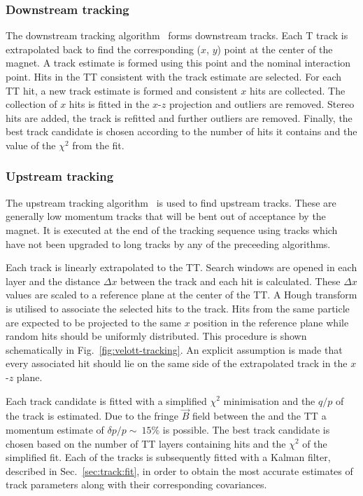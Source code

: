 \subsubsection{Downstream tracking}
\label{sec:track:algos:downstream}

The downstream tracking algorithm~\cite{patdownstream,sascha} forms downstream tracks. Each T track is extrapolated back to find the corresponding ($x$, $y$) point at the center of the magnet. A track estimate is formed using this point and the nominal interaction point. Hits in the TT consistent with the track estimate are selected. For each TT hit, a new track estimate is formed and consistent $x$ hits are collected. The collection of $x$ hits is fitted in the $x$-$z$ projection and outliers are removed. Stereo hits are added, the track is refitted and further outliers are removed. Finally, the best track candidate is chosen according to the number of hits it contains and the value of the $\chi^{2}$ from the fit.


\subsubsection{Upstream tracking}
\label{sec:track:algos:upstream}

The upstream tracking algorithm~\cite{patvelott} is used to find upstream tracks. These are generally low momentum tracks that will be bent out of acceptance by the magnet. It is executed at the end of the tracking sequence using \velo tracks which have not been upgraded to long tracks by any of the preceeding algorithms. 

Each \velo track is linearly extrapolated to the TT. Search windows are opened in each layer and the distance $\Delta x$ between the track and each hit is calculated. These $\Delta x$ values are scaled to a reference plane at the center of the TT. A Hough transform is utilised to associate the selected hits to the \velo track. Hits from the same particle are expected to be projected to the same $x$ position in the reference plane while random hits should be uniformly distributed. This procedure is shown schematically in Fig.~\ref{fig:velott-tracking}. An explicit assumption is made that every associated hit should lie on the same side of the extrapolated \velo track in the $x$-$z$ plane. 

 Each track candidate is fitted with a simplified $\chi^{2}$ minimisation and the $q/p$ of the track is estimated. Due to the fringe $\vec{B}$ field between the \velo and the TT a momentum estimate of $\delta p/p \sim~15\%$ is possible. The best track candidate is chosen based on the number of TT layers containing hits and the $\chi^{2}$ of the simplified fit. Each of the \velott tracks is subsequently fitted with a Kalman filter, described in Sec.~\ref{sec:track:fit}, in order to obtain the most accurate estimates of track parameters along with their corresponding covariances.

